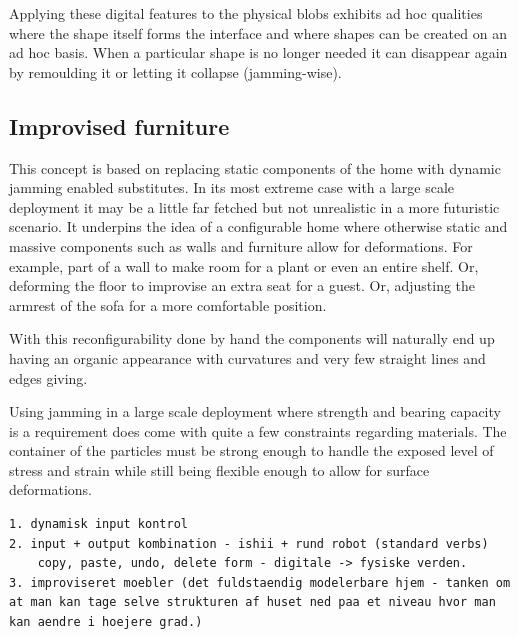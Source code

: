 Applying these digital features to the physical blobs exhibits ad hoc qualities where the shape itself forms the interface and where shapes can be created on an ad hoc basis.
When a particular shape is no longer needed it can disappear again by remoulding it or letting it collapse (jamming-wise).

\subsection{Improvised furniture}
\label{ch:jamming:concepts:improvised_furniture}

This concept is based on replacing static components of the home with dynamic jamming enabled substitutes.
In its most extreme case with a large scale deployment it may be a little far fetched but not unrealistic in a more futuristic scenario.
It underpins the idea of a configurable home where otherwise static and massive components such as walls and furniture allow for deformations.
For example,  part of a wall to make room for a plant or even an entire shelf.
Or, deforming the floor to improvise an extra seat for a guest.
Or, adjusting the armrest of the sofa for a more comfortable position.

With this reconfigurability done by hand the components will naturally end up having an organic appearance with curvatures and very few straight lines and edges giving.

Using jamming in a large scale deployment where strength and bearing capacity is a requirement does come with quite a few constraints regarding materials.
The container of the particles must be strong enough to handle the exposed level of stress and strain while still being flexible enough to allow for surface deformations.

\begin{verbatim}
1. dynamisk input kontrol
2. input + output kombination - ishii + rund robot (standard verbs)
	copy, paste, undo, delete form - digitale -> fysiske verden.
3. improviseret moebler (det fuldstaendig modelerbare hjem - tanken om at man kan tage selve strukturen af huset ned paa et niveau hvor man kan aendre i hoejere grad.)

\end{verbatim}

